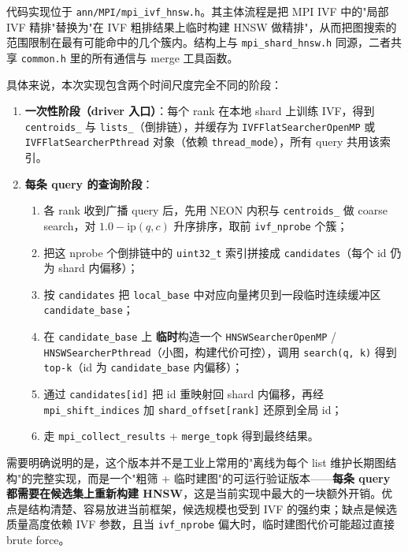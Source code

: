\documentclass[a4paper]{article}
\begin{document}
代码实现位于 \texttt{ann/MPI/mpi\_ivf\_hnsw.h}。其主体流程是把 MPI IVF 中的"局部 IVF 精排"替换为"在 IVF 粗排结果上临时构建 HNSW 做精排"，从而把图搜索的范围限制在最有可能命中的几个簇内。结构上与 \texttt{mpi\_shard\_hnsw.h} 同源，二者共享 \texttt{common.h} 里的所有通信与 merge 工具函数。

具体来说，本次实现包含两个时间尺度完全不同的阶段：

\begin{enumerate}
    \item \textbf{一次性阶段（driver 入口）}：每个 rank 在本地 shard 上训练 IVF，得到 \texttt{centroids\_} 与 \texttt{lists\_}（倒排链），并缓存为 \texttt{IVFFlatSearcherOpenMP} 或 \texttt{IVFFlatSearcherPthread} 对象（依赖 \texttt{thread\_mode}），所有 query 共用该索引。
    \item \textbf{每条 query 的查询阶段}：
    \begin{enumerate}
        \item 各 rank 收到广播 query 后，先用 NEON 内积与 \texttt{centroids\_} 做 coarse search，对 $1.0 - \text{ip}(q, c)$ 升序排序，取前 \texttt{ivf\_nprobe} 个簇；
        \item 把这 nprobe 个倒排链中的 \texttt{uint32\_t} 索引拼接成 \texttt{candidates}（每个 id 仍为 shard 内偏移）；
        \item 按 \texttt{candidates} 把 \texttt{local\_base} 中对应向量拷贝到一段临时连续缓冲区 \texttt{candidate\_base}；
        \item 在 \texttt{candidate\_base} 上 \textbf{临时}构造一个 \texttt{HNSWSearcherOpenMP} / \texttt{HNSWSearcherPthread}（小图，构建代价可控），调用 \texttt{search(q, k)} 得到 \texttt{top-k}（id 为 \texttt{candidate\_base} 内偏移）；
        \item 通过 \texttt{candidates[id]} 把 id 重映射回 shard 内偏移，再经 \texttt{mpi\_shift\_indices} 加 \texttt{shard\_offset[rank]} 还原到全局 id；
        \item 走 \texttt{mpi\_collect\_results} + \texttt{merge\_topk} 得到最终结果。
    \end{enumerate}
\end{enumerate}

需要明确说明的是，这个版本并不是工业上常用的"离线为每个 list 维护长期图结构"的完整实现，而是一个"粗筛 + 临时建图"的可运行验证版本——\textbf{每条 query 都需要在候选集上重新构建 HNSW}，这是当前实现中最大的一块额外开销。优点是结构清楚、容易放进当前框架，候选规模也受到 IVF 的强约束；缺点是候选质量高度依赖 IVF 参数，且当 \texttt{ivf\_nprobe} 偏大时，临时建图代价可能超过直接 brute force。
\end{document}
